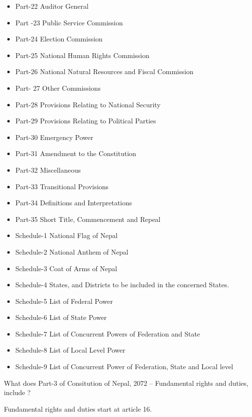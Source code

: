 \begin{questions}
\begin{solution}
\begin{itemize}
  \item Part-22 Auditor General
  \item Part -23 Public Service Commission
  \item Part-24 Election Commission
  \item Part-25 National Human Rights Commission
  \item Part-26 National Natural Resources and Fiscal Commission
  \item Part- 27 Other Commissions
  \item Part-28 Provisions Relating to National Security
  \item Part-29 Provisions Relating to Political Parties
  \item Part-30 Emergency Power
  \item Part-31 Amendment to the Constitution
  \item Part-32 Miscellaneous
  \item Part-33 Transitional Provisions
  \item Part-34 Definitions and Interpretations
  \item Part-35 Short Title, Commencement and Repeal
  \item Schedule-1 National Flag of Nepal
  \item Schedule-2 National Anthem of Nepal
  \item Schedule-3 Coat of Arms of Nepal
  \item Schedule-4 States, and Districts to be included in the concerned States.
  \item Schedule-5 List of Federal Power
  \item Schedule-6 List of State Power
  \item Schedule-7 List of Concurrent Powers of Federation and State
  \item Schedule-8 List of Local Level Power
  \item Schedule-9 List of Concurrent Power of Federation, State and Local level
  \end{itemize}
  \end{solution}

\question What does Part-3 of Consitution of Nepal, 2072 -- Fundamental rights and duties, include ?
  \begin{solution}

  Fundamental rights and duties start at article 16.


\end{solution}
\end{questions}

